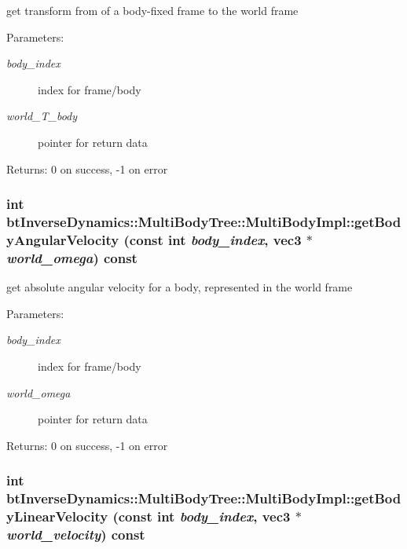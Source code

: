 get transform from of a body-fixed frame to the world frame \begin{Desc}
\item[Parameters:]
\begin{description}
\item[{\em body\_\-index}]index for frame/body \item[{\em world\_\-T\_\-body}]pointer for return data \end{description}
\end{Desc}
\begin{Desc}
\item[Returns:]0 on success, -1 on error \end{Desc}
 \hypertarget{classbt_inverse_dynamics_1_1_multi_body_tree_1_1_multi_body_impl_82fbc5d66ecc8e9392f4cf62ec5bf239}{
\subsubsection[getBodyAngularVelocity]{\setlength{\rightskip}{0pt plus 5cm}int btInverseDynamics::MultiBodyTree::MultiBodyImpl::getBodyAngularVelocity (const int {\em body\_\-index}, \/  {\bf vec3} $\ast$ {\em world\_\-omega}) const}}
\label{classbt_inverse_dynamics_1_1_multi_body_tree_1_1_multi_body_impl_82fbc5d66ecc8e9392f4cf62ec5bf239}


get absolute angular velocity for a body, represented in the world frame \begin{Desc}
\item[Parameters:]
\begin{description}
\item[{\em body\_\-index}]index for frame/body \item[{\em world\_\-omega}]pointer for return data \end{description}
\end{Desc}
\begin{Desc}
\item[Returns:]0 on success, -1 on error \end{Desc}
 \hypertarget{classbt_inverse_dynamics_1_1_multi_body_tree_1_1_multi_body_impl_87604495df09957e2ecd33336bcb8c0f}{
\subsubsection[getBodyLinearVelocity]{\setlength{\rightskip}{0pt plus 5cm}int btInverseDynamics::MultiBodyTree::MultiBodyImpl::getBodyLinearVelocity (const int {\em body\_\-index}, \/  {\bf vec3} $\ast$ {\em world\_\-velocity}) const}}
\label{classbt_inverse_dynamics_1_1_multi_body_tree_1_1_multi_body_impl_87604495df09957e2ecd33336bcb8c0f}


